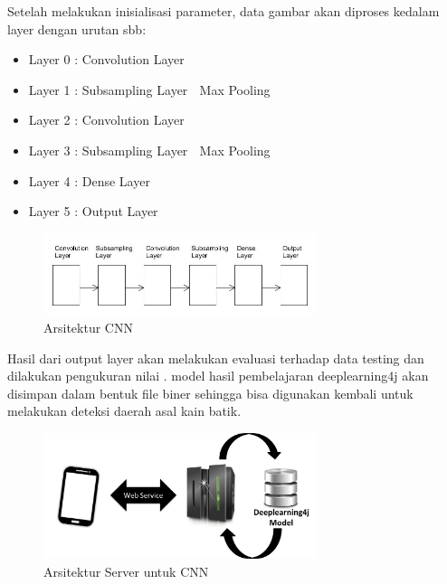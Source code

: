 Setelah melakukan inisialisasi parameter, data gambar akan diproses kedalam layer dengan urutan sbb:
\begin{itemize}
	\item Layer 0 : Convolution Layer
	\item Layer 1 : Subsampling Layer  Max Pooling
	\item Layer 2 : Convolution Layer
	\item Layer 3 : Subsampling Layer  Max Pooling
	\item Layer 4 : Dense Layer
	\item Layer 5 : Output Layer
\end{itemize}

\begin{figure}[htp]
	\centering
	\includegraphics[width=8cm]{pics/arsitektur_cnn}
	\caption{Arsitektur CNN}
	\label{fig:arsitektur_cnn}
\end{figure}
Hasil dari output layer akan melakukan evaluasi terhadap data testing dan dilakukan pengukuran nilai . model hasil pembelajaran deeplearning4j akan disimpan dalam bentuk file biner sehingga bisa digunakan kembali untuk melakukan deteksi daerah asal kain batik.
\begin{figure}[htp]
	\centering
	\includegraphics[width=8cm]{pics/komunikasi_cnn}
	\caption{Arsitektur Server untuk CNN}
	\label{fig:komunikasi_cnn}
\end{figure}